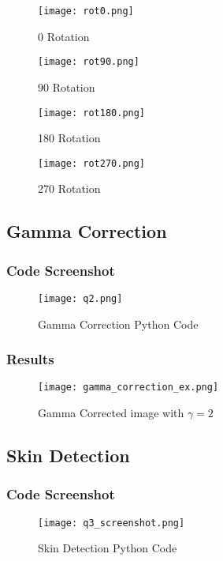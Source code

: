 \documentclass[12pt, letterpaper]{article}
\begin{document}
\begin{figure}[H]
    \centering
    \texttt{[image: rot0.png]}
    \caption{0 Rotation}
\end{figure}

\begin{figure}[H]
    \centering
    \texttt{[image: rot90.png]}
    \caption{90 Rotation}
\end{figure}

\begin{figure}[H]
    \centering
    \texttt{[image: rot180.png]}
    \caption{180 Rotation}
\end{figure}

\begin{figure}[H]
    \centering
    \texttt{[image: rot270.png]}
    \caption{270 Rotation}
\end{figure}

\subsection{Gamma Correction}

\subsubsection{Code Screenshot}
\begin{figure}[H]
    \centering
    \texttt{[image: q2.png]}
    \caption{Gamma Correction Python Code}
\end{figure}

\subsubsection{Results}


\begin{figure}[H]
    \centering
    \texttt{[image: gamma\_correction\_ex.png]}
    \caption{Gamma Corrected image with $\gamma = 2$}
\end{figure}

\subsection{Skin Detection}

\subsubsection{Code Screenshot}
\begin{figure}[H]
    \centering
    \texttt{[image: q3\_screenshot.png]}
    \caption{Skin Detection Python Code}
\end{figure}
\end{document}
